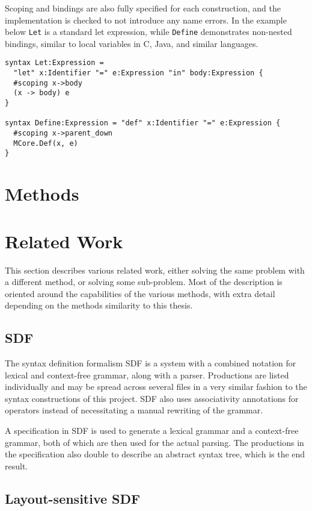 \documentclass{kththesis}
\begin{document}
Scoping and bindings are also fully specified for each construction, and the implementation is checked to not introduce any name errors. In the example below \texttt{Let} is a standard let expression, while \texttt{Define} demonstrates non-nested bindings, similar to local variables in C, Java, and similar languages.

\begin{verbatim}
syntax Let:Expression =
  "let" x:Identifier "=" e:Expression "in" body:Expression {
  #scoping x->body
  (x -> body) e
}

syntax Define:Expression = "def" x:Identifier "=" e:Expression {
  #scoping x->parent_down
  MCore.Def(x, e)
}
\end{verbatim}

\chapter{Methods}

\chapter{Related Work}

This section describes various related work, either solving the same problem with a different method, or solving some sub-problem. Most of the description is oriented around the capabilities of the various methods, with extra detail depending on the methods similarity to this thesis.

\section{SDF}

The syntax definition formalism SDF \cite{Heering1989} is a system with a combined notation for lexical and context-free grammar, along with a parser. Productions are listed individually and may be spread across several files in a very similar fashion to the syntax constructions of this project. SDF also uses associativity annotations for operators instead of necessitating a manual rewriting of the grammar.

A specification in SDF is used to generate a lexical grammar and a context-free grammar, both of which are then used for the actual parsing. The productions in the specification also double to describe an abstract syntax tree, which is the end result.

\section{Layout-sensitive SDF}
\end{document}
